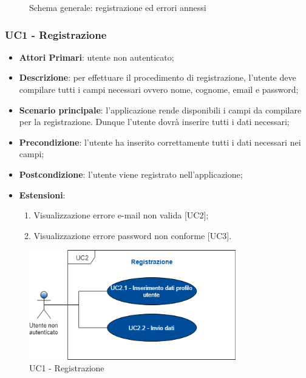 \begin{figure}[h]
	\centering
	\caption{Schema generale: registrazione ed errori annessi}
\end{figure}
\subsubsection{UC1 - Registrazione}
\begin{itemize}
	\item \textbf{Attori Primari}: utente non autenticato;
	\item \textbf{Descrizione}: per effettuare il procedimento di registrazione, l'utente deve compilare tutti i campi necessari ovvero nome, cognome, email e password;
	\item \textbf{Scenario principale}: l'applicazione rende disponibili i campi da compilare per la registrazione. Dunque l'utente dovrà inserire tutti i dati necessari;
	\item \textbf{Precondizione}: l'utente ha inserito correttamente tutti i dati necessari nei campi;
	\item \textbf{Postcondizione}: l'utente viene registrato nell'applicazione;
	\item \textbf{Estensioni}:
		\begin{enumerate}
			\item Visualizzazione errore e-mail non valida [UC2];
			\item Visualizzazione errore password non conforme [UC3]. 
		\end{enumerate} 
\end{itemize}
\begin{figure}[h]
	\includegraphics[width=9cm]{res/images/UC2Registrazione.png}
	\centering
	\caption{UC1 - Registrazione}
\end{figure}

